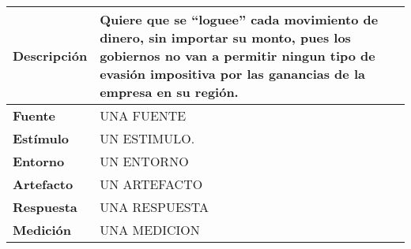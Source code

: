 \begin{center}
  \begin{tabular}{| l | p{10cm} | }
    \hline
  \textbf{Descripción} & Quiere que se “loguee” cada movimiento de dinero, sin importar su monto, pues los gobiernos no van a permitir ningun tipo de evasión impositiva por las ganancias de la empresa en su región. \\  \hline
  \textbf{Fuente} & UNA FUENTE\\  \hline
  \textbf{Estímulo} & UN ESTIMULO.\\  \hline
  \textbf{Entorno} & UN ENTORNO\\  \hline
  \textbf{Artefacto} & UN ARTEFACTO\\  \hline
  \textbf{Respuesta} & UNA RESPUESTA\\  \hline
  \textbf{Medición} & UNA MEDICION\\  \hline
  \end{tabular}
\end{center} 
